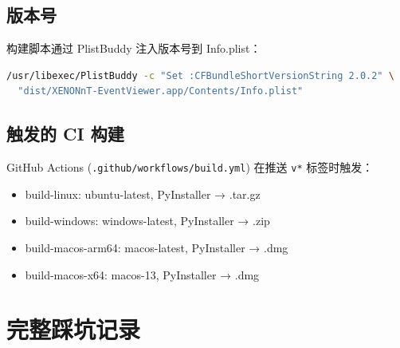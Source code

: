 \documentclass[12pt,a4paper]{article}
\begin{document}
\subsection{版本号}

构建脚本通过 PlistBuddy 注入版本号到 Info.plist：
\begin{lstlisting}[language=bash]
/usr/libexec/PlistBuddy -c "Set :CFBundleShortVersionString 2.0.2" \
  "dist/XENONnT-EventViewer.app/Contents/Info.plist"
\end{lstlisting}

\subsection{触发的 CI 构建}

GitHub Actions (\texttt{.github/workflows/build.yml}) 在推送 \texttt{v*} 标签时触发：
\begin{itemize}[itemsep=2pt]
\item build-linux: ubuntu-latest, PyInstaller → .tar.gz
\item build-windows: windows-latest, PyInstaller → .zip
\item build-macos-arm64: macos-latest, PyInstaller → .dmg
\item build-macos-x64: macos-13, PyInstaller → .dmg
\end{itemize}

\section{完整踩坑记录}
\end{document}
